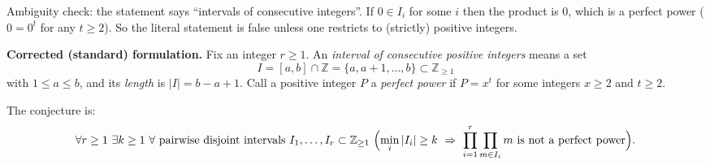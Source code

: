 Ambiguity check: the statement says ``intervals of consecutive integers''. If $0\in I_i$ for some $i$ then the product is $0$, which is a perfect power ($0=0^t$ for any $t\ge 2$). So the literal statement is false unless one restricts to (strictly) positive integers.

\medskip
\noindent\textbf{Corrected (standard) formulation.}
Fix an integer $r\ge 1$. An \emph{interval of consecutive positive integers} means a set
\[
I=[a,b]\cap\mathbb Z=\{a,a+1,\dots,b\}\subset\mathbb Z_{\ge 1}
\]
with $1\le a\le b$, and its \emph{length} is $|I|=b-a+1$.
Call a positive integer $P$ a \emph{perfect power} if $P=x^t$ for some integers $x\ge 2$ and $t\ge 2$.

The conjecture is:
\[
\forall r\ge 1\ \exists k\ge 1\ \forall\text{ pairwise disjoint intervals }I_1,\dots,I_r\subset\mathbb Z_{\ge1}
\ \Bigl(\min_i |I_i|\ge k\ \Rightarrow\ \prod_{i=1}^r\prod_{m\in I_i} m\ \text{is not a perfect power}\Bigr).
\]

